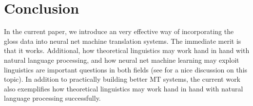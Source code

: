 \documentclass[11pt,a4paper]{article}
\begin{document}
\section{Conclusion}
In the current paper, we introduce an very effective way of incorporating the gloss data into neural net machine translation systems. The immediate merit is that it works. Additional, how theoretical linguistics may work hand in hand with natural language processing, and how neural net machine learning may exploit linguistics are important questions in both fields (see \citet{pater2017generative} for a nice discussion on this topic). In addition to practically building better MT systems, the current work also exemplifies how theoretical linguistics may work hand in hand with natural language processing successfully. 





\appendix
\newpage
\end{document}
